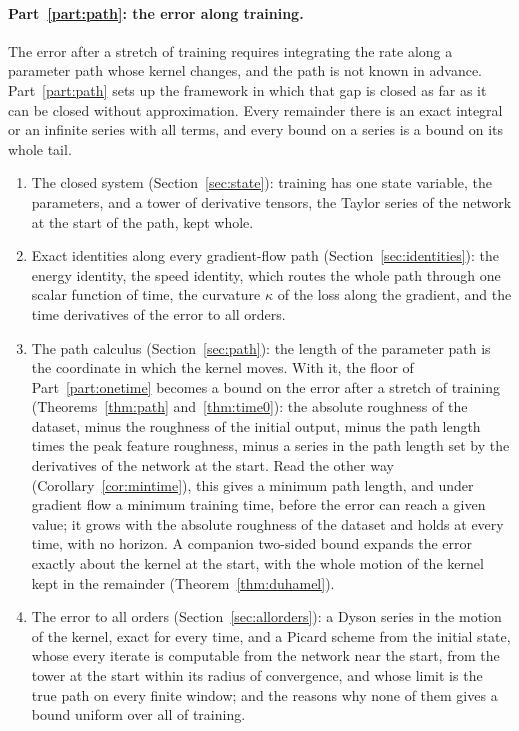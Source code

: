 \documentclass[11pt]{article}
\theoremstyle{definition}
\theoremstyle{remark}
\begin{document}
\paragraph{Part~\ref{part:path}: the error along training.}
The error after a stretch of training requires integrating the rate along a parameter path whose kernel changes, and the path is not known in advance.
Part~\ref{part:path} sets up the framework in which that gap is closed as far as it can be closed without approximation.
Every remainder there is an exact integral or an infinite series with all terms, and every bound on a series is a bound on its whole tail.
\begin{enumerate}[label=(\arabic*),resume]
\item The closed system (Section~\ref{sec:state}): training has one state variable, the parameters, and a tower of derivative tensors, the Taylor series of the network at the start of the path, kept whole.
\item Exact identities along every gradient-flow path (Section~\ref{sec:identities}): the energy identity, the speed identity, which routes the whole path through one scalar function of time, the curvature $\kappa$ of the loss along the gradient, and the time derivatives of the error to all orders.
\item The path calculus (Section~\ref{sec:path}): the length of the parameter path is the coordinate in which the kernel moves.
With it, the floor of Part~\ref{part:onetime} becomes a bound on the error after a stretch of training (Theorems~\ref{thm:path} and~\ref{thm:time0}): the absolute roughness of the dataset, minus the roughness of the initial output, minus the path length times the peak feature roughness, minus a series in the path length set by the derivatives of the network at the start.
Read the other way (Corollary~\ref{cor:mintime}), this gives a minimum path length, and under gradient flow a minimum training time, before the error can reach a given value; it grows with the absolute roughness of the dataset and holds at every time, with no horizon.
A companion two-sided bound expands the error exactly about the kernel at the start, with the whole motion of the kernel kept in the remainder (Theorem~\ref{thm:duhamel}).
\item The error to all orders (Section~\ref{sec:allorders}): a Dyson series in the motion of the kernel, exact for every time, and a Picard scheme from the initial state, whose every iterate is computable from the network near the start, from the tower at the start within its radius of convergence, and whose limit is the true path on every finite window; and the reasons why none of them gives a bound uniform over all of training.

\end{enumerate}
\end{document}
